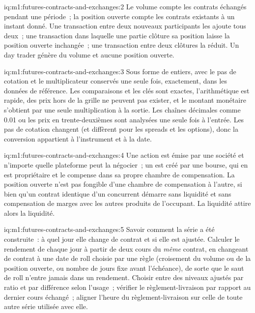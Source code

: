 \begin{solution}{iq:m1:futures-contracts-and-exchanges:2}
Le volume compte les contrats échangés pendant une période~; la position ouverte compte
les contrats existants à un instant donné. Une transaction entre deux nouveaux participants
les ajoute tous deux~; une transaction dans laquelle une partie clôture sa position laisse la position ouverte
inchangée~; une transaction entre deux clôtures la réduit. Un day trader génère
du volume et aucune position ouverte.
\end{solution}

\begin{solution}{iq:m1:futures-contracts-and-exchanges:3}
Sous forme de  entiers, avec le pas de cotation et le multiplicateur conservés une seule fois, exactement, dans
les données de référence. Les comparaisons et les clés sont exactes, l'arithmétique est rapide, des prix
hors de la grille ne peuvent pas exister, et le montant monétaire s'obtient par une seule multiplication à
la sortie. Les chaînes décimales comme 0.01 ou les prix en trente-deuxièmes sont
analysées une seule fois à l'entrée. Les pas de cotation changent (et diffèrent pour les spreads et
les options), donc la conversion appartient à l'instrument et à la date.
\end{solution}

\begin{solution}{iq:m1:futures-contracts-and-exchanges:4}
Une action est émise par une société et n'importe quelle plateforme peut la négocier~; un  est
créé par une bourse, qui en est propriétaire et le compense dans sa propre
chambre de compensation. La position ouverte n'est pas fongible d'une chambre de compensation à l'autre, si bien qu'un
contrat identique d'un concurrent démarre sans liquidité et sans compensation de marges
avec les autres produits de l'occupant. La liquidité attire alors
la liquidité.
\end{solution}

\begin{solution}{iq:m1:futures-contracts-and-exchanges:5}
Savoir comment la série a été construite~: à quel jour elle change de contrat et
si elle est ajustée. Calculer le rendement de chaque jour à partir de deux cours du
\emph{même} contrat, en changeant de contrat à une date de roll choisie par une règle
(croisement du volume ou de la position ouverte, ou nombre de jours fixe avant l'échéance), de sorte que le
saut de roll n'entre jamais dans un rendement. Choisir entre des niveaux ajustés par ratio et
par différence selon l'usage~; vérifier le règlement-livraison par rapport au dernier
cours échangé~; aligner l'heure du règlement-livraison sur celle de toute autre série utilisée avec elle.
\end{solution}

